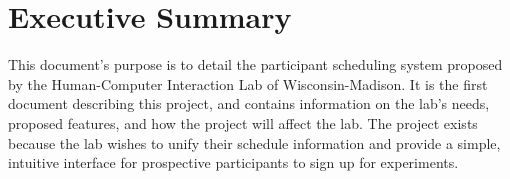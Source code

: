 \newcommand{\puttitle}{Milestone 1}


\section{Executive Summary}
This document's purpose is to detail the participant scheduling system proposed by the Human-Computer Interaction Lab of Wisconsin-Madison. It is the first document describing this project, and contains information on the lab's needs, proposed features, and how the project will affect the lab.  The project exists because the lab wishes to unify their schedule information and provide a simple, intuitive interface for prospective participants to sign up for experiments.








